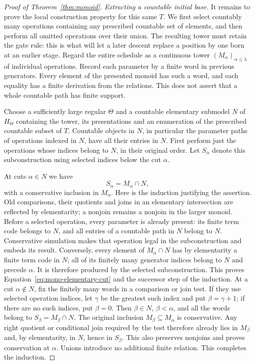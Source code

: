 \begin{proof}[Proof of Theorem~\ref{thm:monoid}]
\smallskip\noindent\textit{Extracting a countable initial base.}
It remains to prove the local construction property for this same $T$.
We first select countably many operations containing any prescribed
countable set of elements, and then perform all omitted operations over
their union.  The resulting tower must retain the gate rule: this is what
will let a later descent replace a position by one born at an earlier
stage.  Regard the
entire schedule as a continuous tower $(M_\alpha)_{\alpha\leq\lambda}$
of individual operations.  Record each parameter by a finite word in
previous generators.  Every element of the presented monoid has such
a word, and each equality has a finite derivation from the relations.
This does not assert that a whole countable path has finite support.

Choose a sufficiently large regular $\Theta$ and a countable elementary
submodel $N$ of $H_\Theta$ containing the tower, its presentations and
an enumeration of the prescribed countable subset of $T$.
Countable objects in $N$, in particular the parameter paths of
operations indexed in $N$, have all their entries in $N$.
First perform just the operations whose indices belong to $N$, in
their original order.  Let $S_\alpha$ denote this subconstruction
using selected indices below the cut $\alpha$.

At cuts $\alpha\in N$ we have
\begin{equation}\label{eq:mono-elementary-cut}
 S_\alpha=M_\alpha\cap N,
\end{equation}
with a conservative inclusion in $M_\alpha$.  Here is the induction
justifying the assertion.  Old comparisons, their quotients and joins
in an elementary intersection are reflected by elementarity; a
nonjoin remains a nonjoin in the larger monoid.  Before a selected
operation, every parameter is already present: its finite term code
belongs to $N$, and all entries of a countable path in $N$ belong to
$N$.  Conservative simulation makes that operation legal in the
subconstruction and embeds its result.  Conversely, every element of
$M_\alpha\cap N$ has by elementarity a finite term code in $N$;
all of its finitely many generator indices belong to $N$ and precede
$\alpha$.  It is therefore produced by the selected subconstruction.
This proves Equation~\eqref{eq:mono-elementary-cut} and the successor
step of the induction.  At a cut $\alpha\notin N$, fix the finitely
many words in a comparison or join test.  If they use selected operation
indices, let $\gamma$ be the greatest such index and put
$\beta=\gamma+1$; if there are no such indices, put $\beta=0$.
Then $\beta\in N$, $\beta<\alpha$, and all the words belong to
$S_\beta=M_\beta\cap N$.  The original inclusion
$M_\beta\subseteq M_\alpha$ is conservative.  Any right quotient or
conditional join required by the test therefore already lies in
$M_\beta$ and, by elementarity, in $N$, hence in $S_\beta$.
This also preserves nonjoins and proves conservation at $\alpha$.
Unions introduce no additional finite relation.  This completes the
induction.


\end{proof}
